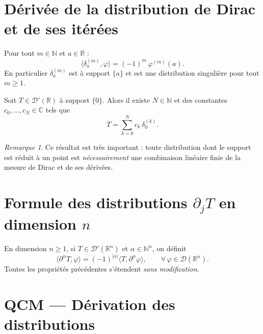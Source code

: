 \documentclass[12pt,a4paper,openany]{book}
\theoremstyle{definition}
\theoremstyle{plain}
\theoremstyle{remark}
\newtheorem*{remark}{Remarque}
\newenvironment{remarque}{\begin{remark}}{\end{remark}}
\begin{document}
	
	\section{Dérivée de la distribution de Dirac et de ses itérées}
	
	\begin{proposition}
		Pour tout $m \in \mathbb{N}$ et $a \in \mathbb{R}$ :
		\[
		\langle \delta_a^{(m)}, \varphi \rangle = (-1)^m\,\varphi^{(m)}(a).
		\]
		En particulier $\delta_a^{(m)}$ est à support $\{a\}$ et est une distribution singulière pour tout $m \geq 1$.
	\end{proposition}
	
	\begin{theorem}
		Soit $T \in \mathcal{D}'(\mathbb{R})$ à support $\{0\}$. Alors il existe $N \in \mathbb{N}$ et des constantes $c_0, \dots, c_N \in \mathbb{C}$ tels que
		\[
		T = \sum_{k=0}^N c_k\,\delta_0^{(k)}.
		\]
	\end{theorem}
	
	\begin{remarque}
		Ce résultat est très important : toute distribution dont le support est réduit à un point est \emph{nécessairement} une combinaison linéaire finie de la mesure de Dirac et de ses dérivées.
	\end{remarque}
	
	\section{Formule des distributions \texorpdfstring{$\partial_j T$}{} en dimension \texorpdfstring{$n$}{n}}
	
	En dimension $n \geq 1$, si $T \in \mathcal{D}'(\mathbb{R}^n)$ et $\alpha \in \mathbb{N}^n$, on définit
	\[
	\langle \partial^\alpha T, \varphi \rangle = (-1)^{|\alpha|}\langle T, \partial^\alpha \varphi\rangle,
	\qquad \forall\,\varphi \in \mathcal{D}(\mathbb{R}^n).
	\]
	Toutes les propriétés précédentes s'étendent \emph{sans modification}.
	
	
	\section{QCM — Dérivation des distributions}
	
\end{document}
